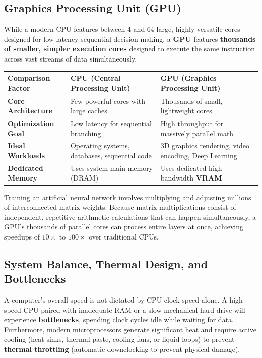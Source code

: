 \subsection{Graphics Processing Unit (GPU)}
While a modern CPU features between 4 and 64 large, highly versatile cores designed for low-latency sequential decision-making, a \textbf{GPU} features \textbf{thousands of smaller, simpler execution cores} designed to execute the same instruction across vast streams of data simultaneously.

\begin{center}
\small
\renewcommand{\arraystretch}{1.3}
\begin{tabularx}{\textwidth}{l X X}
\toprule
\textbf{Comparison Factor} & \textbf{CPU (Central Processing Unit)} & \textbf{GPU (Graphics Processing Unit)} \\
\midrule
\textbf{Core Architecture} & Few powerful cores with large caches & Thousands of small, lightweight cores \\
\textbf{Optimization Goal} & Low latency for sequential branching & High throughput for massively parallel math \\
\textbf{Ideal Workloads} & Operating systems, databases, sequential code & 3D graphics rendering, video encoding, Deep Learning \\
\textbf{Dedicated Memory} & Uses system main memory (DRAM) & Uses dedicated high-bandwidth \textbf{VRAM} \\
\bottomrule
\end{tabularx}
\end{center}

\begin{example}
Training an artificial neural network involves multiplying and adjusting millions of interconnected matrix weights. Because matrix multiplications consist of independent, repetitive arithmetic calculations that can happen simultaneously, a GPU's thousands of parallel cores can process entire layers at once, achieving speedups of $10\times$ to $100\times$ over traditional CPUs.
\end{example}

\subsection{System Balance, Thermal Design, and Bottlenecks}
A computer's overall speed is not dictated by CPU clock speed alone. A high-speed CPU paired with inadequate RAM or a slow mechanical hard drive will experience \textbf{bottlenecks}, spending clock cycles idle while waiting for data. Furthermore, modern microprocessors generate significant heat and require active cooling (heat sinks, thermal paste, cooling fans, or liquid loops) to prevent \textbf{thermal throttling} (automatic downclocking to prevent physical damage).

